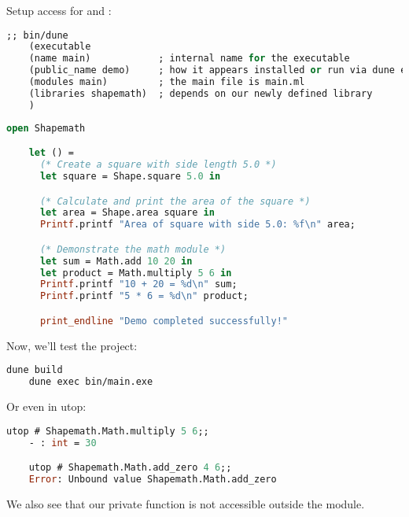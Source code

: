 \begin{Example}

  Setup access for  and :

  \begin{lstlisting}[language=OCaml, numbers=none, caption={\textbf{bin/dune} file}]
    ;; bin/dune
    (executable
    (name main)            ; internal name for the executable
    (public_name demo)     ; how it appears installed or run via dune exec
    (modules main)         ; the main file is main.ml
    (libraries shapemath)  ; depends on our newly defined library
    )
  \end{lstlisting}
  \begin{lstlisting}[language=OCaml, numbers=none, caption={\textbf{bin/main.ml} file}]
    open Shapemath

    let () =
      (* Create a square with side length 5.0 *)
      let square = Shape.square 5.0 in

      (* Calculate and print the area of the square *)
      let area = Shape.area square in
      Printf.printf "Area of square with side 5.0: %f\n" area;

      (* Demonstrate the math module *)
      let sum = Math.add 10 20 in
      let product = Math.multiply 5 6 in
      Printf.printf "10 + 20 = %d\n" sum;
      Printf.printf "5 * 6 = %d\n" product;

      print_endline "Demo completed successfully!"
  \end{lstlisting}

  \noindent
  Now, we'll test the project:
  \begin{lstlisting}[language=OCaml, numbers=none]
    dune build
    dune exec bin/main.exe
  \end{lstlisting}

  \noindent
  Or even in utop:
  \begin{lstlisting}[language=OCaml, numbers=none]
    utop # Shapemath.Math.multiply 5 6;;
    - : int = 30

    utop # Shapemath.Math.add_zero 4 6;;
    Error: Unbound value Shapemath.Math.add_zero
  \end{lstlisting}
  \noindent
  We also see that our private function  is not accessible outside the module.
\end{Example}

\newpage 

